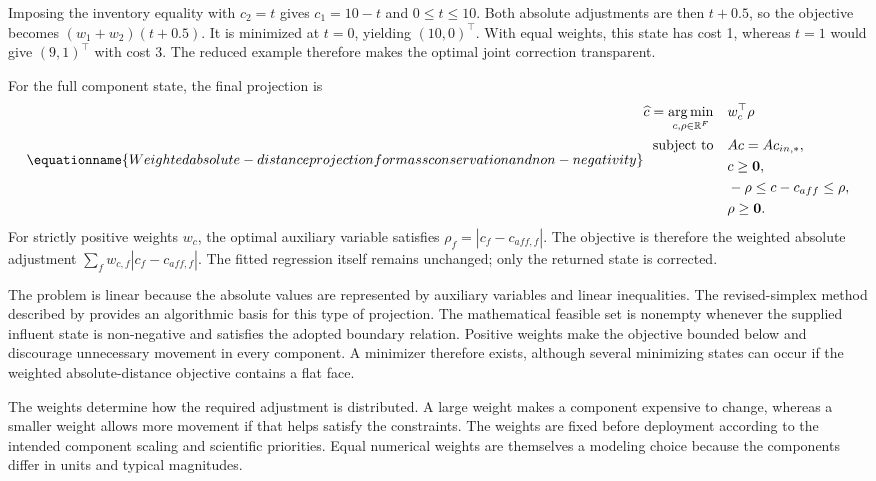 Imposing the inventory equality with \(c_2=t\) gives \(c_1=10-t\) and \(0\leq t\leq10\). Both absolute adjustments are then \(t+0.5\), so the objective becomes \((w_1+w_2)(t+0.5)\). It is minimized at \(t=0\), yielding \((10,0)^\top\). With equal weights, this state has cost 1, whereas \(t=1\) would give \((9,1)^\top\) with cost 3. The reduced example therefore makes the optimal joint correction transparent.

For the full component state, the final projection is
\begin{equation}
\equationname{Weighted absolute-distance projection for mass conservation and non-negativity}
\label{eq:icsor_weighted_correction}
\begin{aligned}
\widehat c =\mathop{\arg\min}_{c,\rho\in\mathbb{R}^{F}}\quad
& w_c^\top\rho\\
\text{subject to}\quad
& Ac=Ac_{in,*},\\
& c\geq\mathbf{0},\\
& -\rho\leq c-c_{aff}\leq\rho,\\
& \rho\geq\mathbf{0}.
\end{aligned}
\end{equation}
For strictly positive weights \(w_c\), the optimal auxiliary variable satisfies \(\rho_f=|c_f-c_{aff,f}|\). The objective is therefore the weighted absolute adjustment \(\sum_f w_{c,f}|c_f-c_{aff,f}|\). The fitted regression itself remains unchanged; only the returned state is corrected.

The problem is linear because the absolute values are represented by auxiliary variables and linear inequalities. The revised-simplex method described by \citet{HuangfuHall2018} provides an algorithmic basis for this type of projection. The mathematical feasible set is nonempty whenever the supplied influent state is non-negative and satisfies the adopted boundary relation. Positive weights make the objective bounded below and discourage unnecessary movement in every component. A minimizer therefore exists, although several minimizing states can occur if the weighted absolute-distance objective contains a flat face.

The weights determine how the required adjustment is distributed. A large weight makes a component expensive to change, whereas a smaller weight allows more movement if that helps satisfy the constraints. The weights are fixed before deployment according to the intended component scaling and scientific priorities. Equal numerical weights are themselves a modeling choice because the components differ in units and typical magnitudes.

